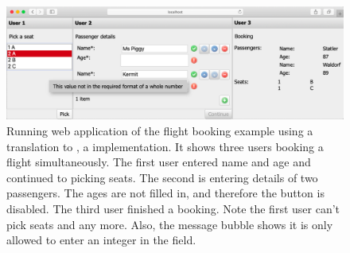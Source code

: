 \begin{figure}[h]
  \includegraphics[width=\columnwidth]{figures/flight-booking.png}
  \caption{
    Running web application of the flight booking example using a translation to \ITASKS,
    a \TOP implementation.
    It shows three users booking a flight simultaneously.
    The first user entered name and age and continued to picking seats.
    The second is entering details of two passengers.
    The ages are not filled in, and therefore the  button is disabled.
    The third user finished a booking.
    Note the first user can't pick seats  and  any more.
    Also, the message bubble shows it is only allowed to enter an integer in the  field.
  }
  \label{fig:flight-booking}
\end{figure}
